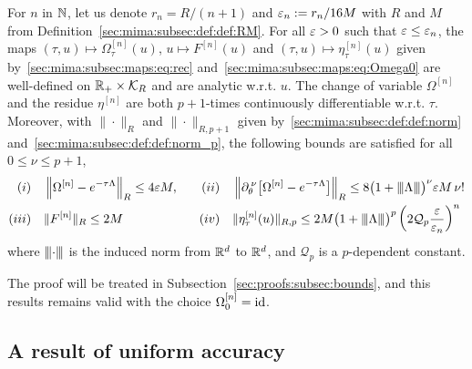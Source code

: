 \begin{theorem} \label{sec:mima:subsec:maps:thm:bounds}
For $n$ in $\mathbb{N}$, let us denote $r_n = R/(n+1)$ and $\varepsilon_n := r_n/16 M$ 
with $R$ and $M$ from Definition~\ref{sec:mima:subsec:def:def:RM}. 
For all $\varepsilon > 0$ such that $\varepsilon \leq \varepsilon_n$, 
the maps  $(\tau, u) \mapsto \Omega^{[n]}_{\tau}(u)$, 
$u \mapsto F^{[n]}(u)$ and $(\tau, u) \mapsto \eta^{[n]}_{\tau}(u)$ 
given by~\eqref{sec:mima:subsec:maps:eq:rec} 
and~\eqref{sec:mima:subsec:maps:eq:Omega0} 
are well-defined on $\mathbb{R}_+ \times \mathcal{K}_{R}$ and are analytic w.r.t. $u$. 
The change of variable $\Omega^{[n]}$ and the residue $\eta^{[n]}$ 
are both $p+1$-times continuously differentiable w.r.t. $\tau$. 
Moreover, with $\| \cdot \|_{R}$ and $\| \cdot \|_{R, p+1}$ given 
by~\eqref{sec:mima:subsec:def:def:norm} and~\eqref{sec:mima:subsec:def:def:norm_p}, 
the following bounds are satisfied for all $0 \leq \nu \leq p+1$, 
\begin{align*}
(i)\quad{}&{} 
\left\| \Omega^{[n]} - e^{-\tau\Lambda} \right\|_{R} \leq 4\varepsilon M, 
& 
\quad(ii)\quad{}&{} 
\left\| \partial_{\theta}^{\:\nu}  \big[ \Omega^{[n]} 
- e^{-\tau \Lambda} \big] \right\|_{R} 
\leq 8 \big( 1+{\left\vert\kern-0.25ex\left\vert\kern-0.25ex\left\vert \Lambda \right\vert\kern-0.25ex\right\vert\kern-0.25ex\right\vert} \big)^{\nu} \varepsilon M \, \nu! 
\\
(iii)\quad{}&{} 
\| F^{[n]} \|_{R} \leq 2M 
& 
(iv)\quad{}&{} 
\| \eta^{[n]}_{\tau}(u) \|_{R,p} \leq 2 M \big( 1 + {\left\vert\kern-0.25ex\left\vert\kern-0.25ex\left\vert \Lambda \right\vert\kern-0.25ex\right\vert\kern-0.25ex\right\vert} \big)^{p} 
\left( 2\mathcal Q_p \frac{\varepsilon}{\varepsilon_n} \right)^n 
\end{align*}
where ${\left\vert\kern-0.25ex\left\vert\kern-0.25ex\left\vert \cdot \right\vert\kern-0.25ex\right\vert\kern-0.25ex\right\vert}$ is the induced norm from $\mathbb{R}^d$ to $\mathbb{R}^d$, 
and $\mathcal Q_p$ is a $p$-dependent constant. 
\end{theorem}
%
The proof will be treated in Subsection~\ref{sec:proofs:subsec:bounds}, 
and this results remains valid with the choice $\Omega^{[n]}_0 = \operatorname{id}$. 






\subsection{A result of uniform accuracy} \label{sec:mima:subsec:ua}

